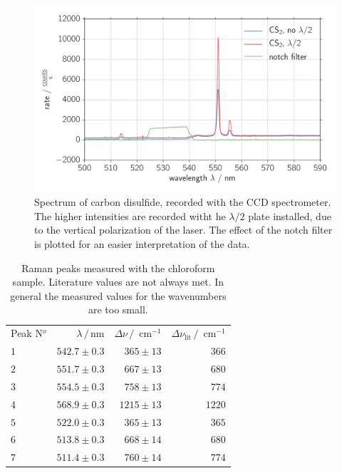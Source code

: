 \begin{figure}[htpb]
    \centering
    \includegraphics[width=0.8\linewidth]{analysis/figures/ccd_cs2_spectra}
    \caption{
        Spectrum of carbon disulfide, recorded with the CCD spectrometer. 
        The higher intensities are recorded witht he $\lambda / 2$ plate installed, 
        due to the vertical polarization of the laser. The effect of the notch filter
        is plotted for an easier interpretation of the data.}
    \label{fig:ccd_cs2_spectra}
\end{figure}

\begin{table}[htpb]
    \centering
    \caption{
        Raman peaks measured with the chloroform sample. Literature values are not always met. In general the 
        measured values for the wavenumbers are too small.
        }
    \label{tab:ccd_chcl3_peaks}
    \begin{tabular}{l r r r}
        \rowcolor{LightCyan} Peak N$^o$ & $\lambda \, / \, \text{nm}$ &
        $\Delta \nu \, / \, \text{ cm}^{-1}$ & 
        $\Delta \nu_\text{lit} \, / \, \text{ cm}^{-1}$ \\
        \cellcolor{LightCyan}$1$ & $542.7 \pm 0.3$ & $365 \pm 13$ & $366$   \\
        \cellcolor{LightCyan}$2$ & $551.7 \pm 0.3$ & $667 \pm 13$ & $680$   \\
        \cellcolor{LightCyan}$3$ & $554.5 \pm 0.3$ & $758 \pm 13$ & $774$   \\
        \cellcolor{LightCyan}$4$ & $568.9 \pm 0.3$ & $1215 \pm 13$ & $1220$   \\
        \cellcolor{LightCyan}$5$ & $522.0 \pm 0.3$ & $365 \pm 13$ & $365$   \\
        \cellcolor{LightCyan}$6$ & $513.8 \pm 0.3$ & $668 \pm 14$ & $680$   \\
        \cellcolor{LightCyan}$7$ & $511.4 \pm 0.3$ & $760 \pm 14$ & $774$   
    \end{tabular}
\end{table}

